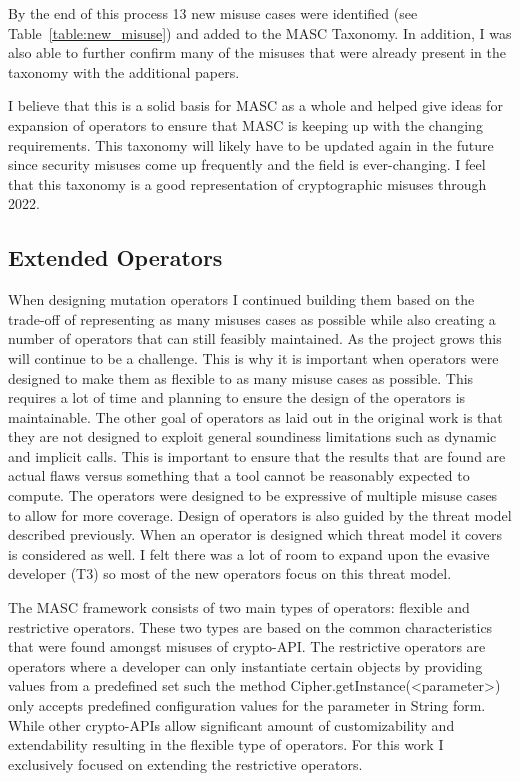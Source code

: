 By the end of this process 13 new misuse cases were identified (see Table~\ref{table:new_misuse}) and added to the MASC Taxonomy. In addition, I was also able to further confirm many of the misuses that were already present in the taxonomy with the additional papers.



I believe that this is a solid basis for MASC as a whole and helped give ideas for expansion of operators to ensure that MASC is keeping up with the changing requirements. This taxonomy will likely have to be updated again in the future since security misuses come up frequently and the field is ever-changing. I feel that this taxonomy is a good representation of cryptographic misuses through 2022.

\subsection{Extended Operators}
\label{ch2:sec:operators}

When designing mutation operators I continued building them based on the trade-off of representing as many misuses cases as possible while also creating a number of operators that can still feasibly maintained. As the project grows this will continue to be a challenge. This is why it is important when operators were designed to make them as flexible to as many misuse cases as possible. This requires a lot of time and planning to ensure the design of the operators is maintainable. The other goal of operators as laid out in the original work is that they are not designed to exploit general soundiness limitations such as dynamic and implicit calls. This is important to ensure that the results that are found are actual flaws versus something that a tool cannot be reasonably expected to compute. The operators were designed to be expressive of multiple misuse cases to allow for more coverage. Design of operators is also guided by the threat model described previously. When an operator is designed which threat model it covers is considered as well. I felt there was a lot of room to expand upon the evasive developer (T3) so most of the new operators focus on this threat model.

The MASC framework consists of two main types of operators: flexible and restrictive operators. These two types are based on the common characteristics that were found amongst misuses of crypto-API. The restrictive operators are operators where a developer can only instantiate certain objects by providing values from a predefined set such the method Cipher.getInstance(<parameter>) only accepts predefined configuration values for the parameter in String form. While other crypto-APIs allow significant amount of customizability and extendability resulting in the flexible type of operators. For this work I exclusively focused on extending the restrictive operators.

